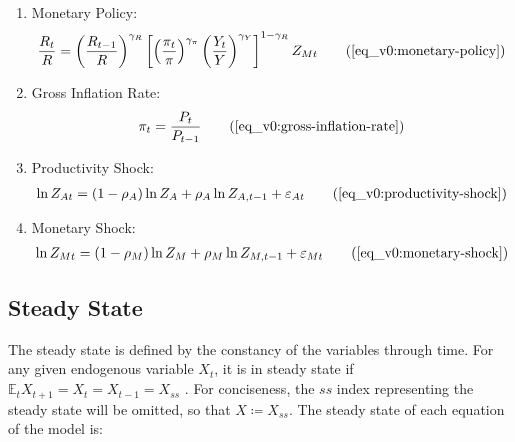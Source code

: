 \documentclass[
thesis.tex
]{subfiles}
\begin{document}
{\begin{itemize}
\begin{enumerate}
				\item Monetary Policy:
				\begin{align}
					\frac{R_t}{R} = \left( 
					\frac{R_{t-1}}{R} \right)^{\gamma_R} \left[ \left(
					\frac{\pi_t}{\pi} \right)^{\gamma_\pi} \left( 
					\frac{Y_t}{Y} \right)^{\gamma_Y} \right]^{1-\gamma_R} Z_{Mt}
					\tag{\ref{eq_v0:monetary-policy}}
				\end{align}
				
				\item Gross Inflation Rate:
				\begin{align}
					\pi_t = \frac{P_t}{P_{t-1}}
					\tag{\ref{eq_v0:gross-inflation-rate}}
				\end{align}
				
				\item Productivity Shock:
				\begin{align}
					\ln{Z_{At}} = (1-\rho_A)\ln{Z_A} + \rho_A\ln{Z_{A,t-1}} + \varepsilon_{At}
					\tag{\ref{eq_v0:productivity-shock}}
				\end{align}
				
				\item Monetary Shock:
				\begin{align}
					\ln{Z_{Mt}} = (1-\rho_M)\ln{Z_{M}} + \rho_M\ln{Z_{M,t-1}} + \varepsilon_{Mt}
					\tag{\ref{eq_v0:monetary-shock}}
				\end{align}
				
			\end{enumerate}
			
		\end{itemize}
		
	} %
	
	
	
	\subsection{Steady State}
	
	The steady state is defined by the constancy of the variables through time. For any given endogenous variable $X_t$, it is in steady state if $\mathbb{E}_t X_{t+1} = X_t = X_{t-1} = X_{ss}$ \cite[p.41]{costa_junior_understanding_2016}. For conciseness, the $ss$ index representing the steady state will be omitted, so that $X \coloneq X_{ss}$. The steady state of each equation of the model is:
	
\end{document}
